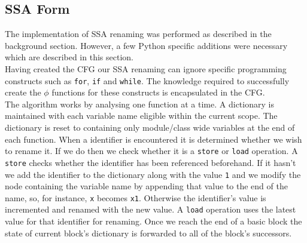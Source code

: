 \documentclass[12pt, titlepage]{article}
\begin{document}
\subsection{SSA Form}
The implementation of SSA renaming was performed as described in the background section. However, a few Python specific additions were necessary which are described in this section. \\
\indent Having created the CFG our SSA renaming can ignore specific programming constructs such as \texttt{for}, \texttt{if} and \texttt{while}. The knowledge required to successfully create the $\phi$ functions for these constructs is encapsulated in the CFG. \\
\indent The algorithm works by analysing one function at a time. A dictionary is maintained with each variable name eligible within the current scope. The dictionary is reset to containing only module/class wide variables at the end of each function. When a identifier is encountered it is determined whether we wish to rename it. If we do then we check whether it is a \texttt{store} or \texttt{load} operation. A \texttt{store} checks whether the identifier has been referenced beforehand. If it hasn't we add the identifier to the dictionary along with the value \texttt{1} and we modify the node containing the variable name by appending that value to the end of the name, so, for instance, \texttt{x} becomes \texttt{x1}. Otherwise the identifier's value is incremented and renamed with the new value. A \texttt{load} operation uses the latest value for that identifier for renaming. Once we reach the end of a basic block the state of current block's dictionary is forwarded to all of the block's successors.
\end{document}
